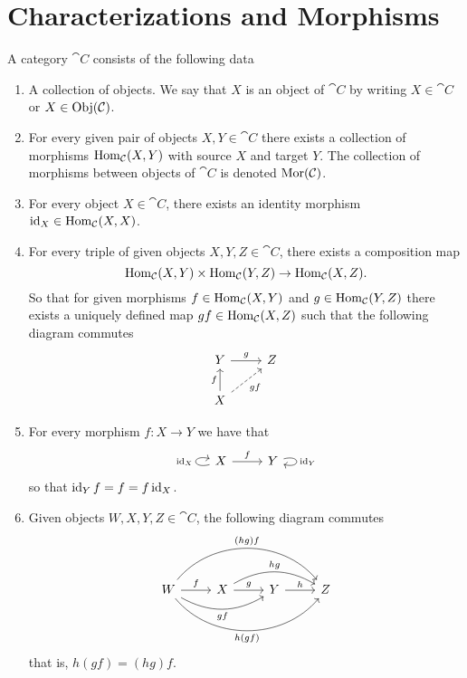 \section{Characterizations and Morphisms}

\begin{definition}[Category]\label{def: category}
  A category \(\cat C\) consists of the following data
  \begin{enumerate}[(C1)]
    \item A collection of objects. We say that \(X\) is an object of \(\cat C\)
      by writing \(X \in \cat C\) or \(X \in \operatorname{Obj}(\mathcal C)\).
    \item For every given pair of objects \(X, Y \in \cat C\) there exists a
      collection of morphisms \(\operatorname{Hom}_{\mathcal C}(X, Y)\) with source \(X\) and
      target \(Y\). The collection of morphisms between objects of \(\cat C\) is
      denoted \(\operatorname{Mor}(\mathcal C)\).
    \item For every object \(X \in \cat C\), there exists an identity morphism
      \(\operatorname{id}_X \in \operatorname{Hom}_{\mathcal C}(X, X)\).
    \item For every triple of given objects \(X, Y, Z \in \cat C\), there exists
      a composition map
      \[
        \operatorname{Hom}_{\mathcal C}(X, Y) \times \operatorname{Hom}_{\mathcal C}(Y, Z) \to \operatorname{Hom}_{\mathcal C}(X, Z).
      \]
      So that for given morphisms \(f \in \operatorname{Hom}_{\mathcal C}(X, Y)\) and \(g \in
      \operatorname{Hom}_{\mathcal C}(Y, Z)\) there exists a uniquely defined map \(g  f \in
      \operatorname{Hom}_{\mathcal C}(X, Z)\) such that the following diagram commutes
      \[
        \begin{tikzcd}
          Y \ar[r, "g"]
            &Z \\
          X \ar[u, "f"] \ar[ru, dashed, swap, "g  f"]
        \end{tikzcd}
      \]
    \item For every morphism \(f: X \to Y\) we have that
      \[
        \begin{tikzcd}
          X \ar[r, "f"] \ar[loop left, "\Id_X"] &Y \ar[loop right, "\Id_Y"]
        \end{tikzcd}
      \]
      so that \(\operatorname{id}_Y  f = f = f  \operatorname{id}_X\).
    \item Given objects \(W, X, Y, Z \in \cat C\), the following diagram commutes
      \[
        \begin{tikzcd}
          W
          \ar[r, "f"]
          \ar[rr, bend right, swap, "g  f"]
          \ar[rrr, bend right = 50, swap, "h  (g  f)"]
          \ar[rrr, bend left = 50, "(h  g)  f"]
            &X
            \ar[r, "g"] \ar[rr, bend left, "h  g"]
              &Y
              \ar[r, "h"]
                &Z
        \end{tikzcd}
      \]
      that is, \(h  (g  f) = (h  g)  f\).
  \end{enumerate}
\end{definition}


